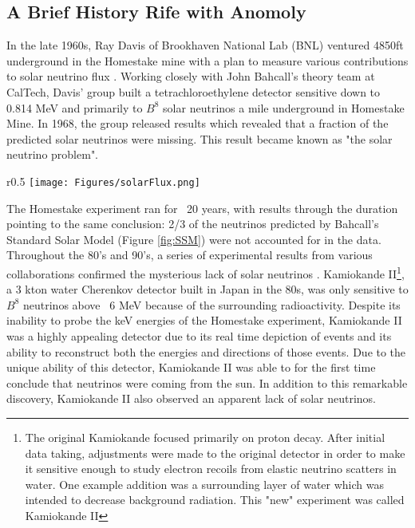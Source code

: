 \documentclass[12pt]{article}
\begin{document}
\subsection{A Brief History Rife with Anomoly}
In the late 1960s, Ray Davis of Brookhaven National Lab (BNL) ventured 4850ft underground in the Homestake mine with a plan to measure various contributions to solar neutrino flux \cite{ray0}. Working closely with John Bahcall's theory team at CalTech, Davis' group built a tetrachloroethylene detector sensitive down to 0.814 MeV and primarily to $B^8$ solar neutrinos\cite{ray0} a mile underground in Homestake Mine. In 1968, the group released results which revealed that a fraction of the predicted solar neutrinos were missing. This result became known as "the solar neutrino problem".

\begin{wrapfigure}{r}{0.5\textwidth}
\texttt{[image: Figures/solarFlux.png]}
\caption{John Bahcall's Standard Solar Flux Model}
\label{fig:SSM}
\end{wrapfigure}

\par The Homestake experiment ran for ~20 years, with results through the duration pointing to the same conclusion: 2/3 of the neutrinos predicted by Bahcall's Standard Solar Model (Figure \ref{fig:SSM}) were not accounted for in the data\cite{ray0}.  Throughout the 80's and 90's, a series of experimental results from various collaborations confirmed the mysterious lack of solar neutrinos \cite{rayreview} \cite{kam0} \cite{sno}.  Kamiokande II\footnote{The original Kamiokande focused primarily on proton decay. After initial data taking, adjustments were made to the original detector in order to make it sensitive enough to study electron recoils from elastic neutrino scatters in water. One example addition was a surrounding layer of water which was intended to decrease background radiation.  This "new" experiment was called Kamiokande II}, a 3 kton water Cherenkov detector built in Japan in the 80s, was only sensitive to $B^8$ neutrinos above ~6 MeV\cite{kam0} because of the surrounding radioactivity. Despite its inability to probe the keV energies of the Homestake experiment, Kamiokande II was a highly appealing detector due to its real time depiction of events and its ability to reconstruct both the energies and directions of those events\cite{kam0}. Due to the unique ability of this detector, Kamiokande II was able to for the first time conclude that neutrinos were coming from the sun.  In addition to this remarkable discovery, Kamiokande II also observed an apparent lack of solar neutrinos.
\end{document}
